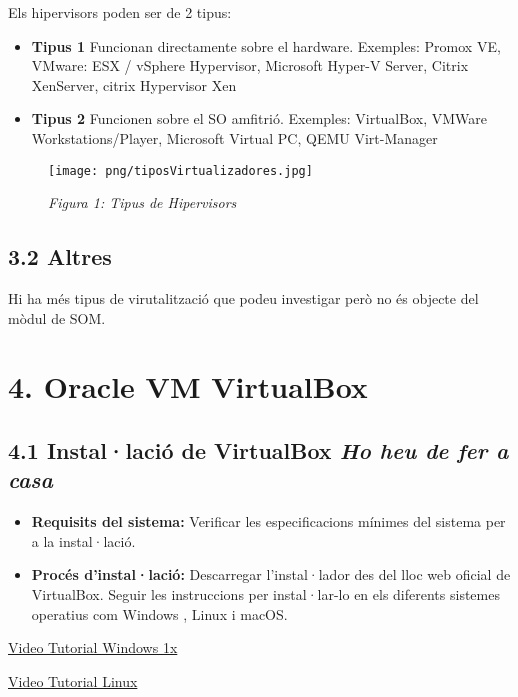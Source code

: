 \documentclass[
  12 pt,
  a4paper,
]{article}
\providecommand{\tightlist}{%
  \setlength{\itemsep}{0pt}\setlength{\parskip}{0pt}}
\begin{document}
Els hipervisors poden ser de 2 tipus:

\begin{itemize}
\item
  \textbf{Tipus 1} Funcionan directamente sobre el hardware. Exemples:
  Promox VE, VMware: ESX / vSphere Hypervisor, Microsoft Hyper-V Server,
  Citrix XenServer, citrix Hypervisor Xen
\item
  \textbf{Tipus 2} Funcionen sobre el SO amfitrió. Exemples: VirtualBox,
  VMWare Workstations/Player, Microsoft Virtual PC, QEMU Virt-Manager
\end{itemize}

\begin{figure}
\centering
\texttt{[image: png/tiposVirtualizadores.jpg]}
\caption{\emph{Figura 1: Tipus de Hipervisors}}
\end{figure}

\subsection{3.2 Altres}\label{altres}

Hi ha més tipus de virutalització que podeu investigar però no és
objecte del mòdul de SOM.

\section{4. Oracle VM VirtualBox}\label{oracle-vm-virtualbox}

\subsection{\texorpdfstring{4.1 Instal·lació de VirtualBox \emph{Ho heu
de fer a
casa}}{4.1 Instal·lació de VirtualBox Ho heu de fer a casa}}\label{installaciuxf3-de-virtualbox-ho-heu-de-fer-a-casa}

\begin{itemize}
\tightlist
\item
  \textbf{Requisits del sistema:} Verificar les especificacions mínimes
  del sistema per a la instal·lació.
\item
  \textbf{Procés d'instal·lació:} Descarregar l'instal·lador des del
  lloc web oficial de VirtualBox. Seguir les instruccions per
  instal·lar-lo en els diferents sistemes operatius com Windows , Linux
  i macOS.
\end{itemize}

\href{}{Video Tutorial Windows 1x}

\href{}{Video Tutorial Linux}
\end{document}
